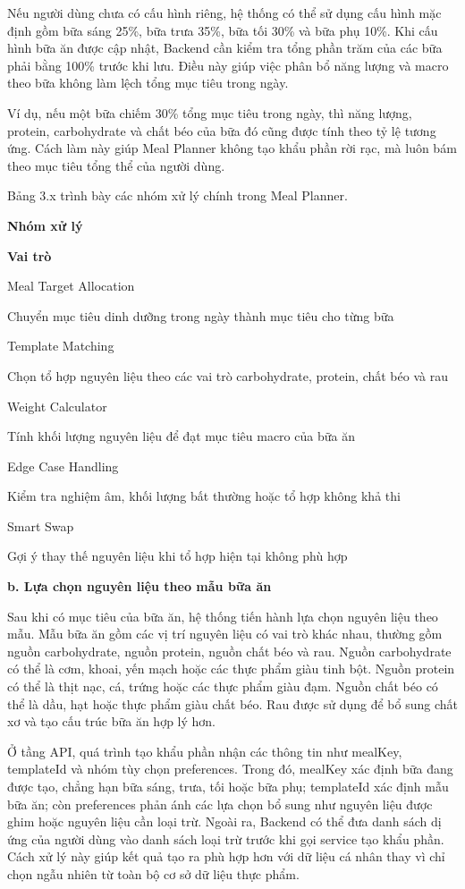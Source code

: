 Nếu người dùng chưa có cấu hình riêng, hệ thống có thể sử dụng cấu hình mặc định gồm bữa sáng 25\%, bữa trưa 35\%, bữa tối 30\% và bữa phụ 10\%. Khi cấu hình bữa ăn được cập nhật, Backend cần kiểm tra tổng phần trăm của các bữa phải bằng 100\% trước khi lưu. Điều này giúp việc phân bổ năng lượng và macro theo bữa không làm lệch tổng mục tiêu trong ngày.

Ví dụ, nếu một bữa chiếm 30\% tổng mục tiêu trong ngày, thì năng lượng, protein, carbohydrate và chất béo của bữa đó cũng được tính theo tỷ lệ tương ứng. Cách làm này giúp Meal Planner không tạo khẩu phần rời rạc, mà luôn bám theo mục tiêu tổng thể của người dùng.

Bảng 3.x trình bày các nhóm xử lý chính trong Meal Planner.

\textbf{Nhóm xử lý}

\textbf{Vai trò}

Meal Target Allocation

Chuyển mục tiêu dinh dưỡng trong ngày thành mục tiêu cho từng bữa

Template Matching

Chọn tổ hợp nguyên liệu theo các vai trò carbohydrate, protein, chất béo và rau

Weight Calculator

Tính khối lượng nguyên liệu để đạt mục tiêu macro của bữa ăn

Edge Case Handling

Kiểm tra nghiệm âm, khối lượng bất thường hoặc tổ hợp không khả thi

Smart Swap

Gợi ý thay thế nguyên liệu khi tổ hợp hiện tại không phù hợp

\textbf{b. Lựa chọn nguyên liệu theo mẫu bữa ăn}

Sau khi có mục tiêu của bữa ăn, hệ thống tiến hành lựa chọn nguyên liệu theo mẫu. Mẫu bữa ăn gồm các vị trí nguyên liệu có vai trò khác nhau, thường gồm nguồn carbohydrate, nguồn protein, nguồn chất béo và rau. Nguồn carbohydrate có thể là cơm, khoai, yến mạch hoặc các thực phẩm giàu tinh bột. Nguồn protein có thể là thịt nạc, cá, trứng hoặc các thực phẩm giàu đạm. Nguồn chất béo có thể là dầu, hạt hoặc thực phẩm giàu chất béo. Rau được sử dụng để bổ sung chất xơ và tạo cấu trúc bữa ăn hợp lý hơn.

Ở tầng API, quá trình tạo khẩu phần nhận các thông tin như mealKey, templateId và nhóm tùy chọn preferences. Trong đó, mealKey xác định bữa đang được tạo, chẳng hạn bữa sáng, trưa, tối hoặc bữa phụ; templateId xác định mẫu bữa ăn; còn preferences phản ánh các lựa chọn bổ sung như nguyên liệu được ghim hoặc nguyên liệu cần loại trừ. Ngoài ra, Backend có thể đưa danh sách dị ứng của người dùng vào danh sách loại trừ trước khi gọi service tạo khẩu phần. Cách xử lý này giúp kết quả tạo ra phù hợp hơn với dữ liệu cá nhân thay vì chỉ chọn ngẫu nhiên từ toàn bộ cơ sở dữ liệu thực phẩm.

